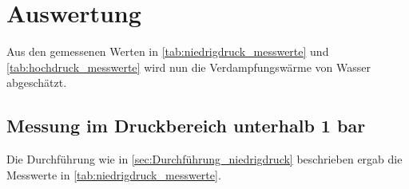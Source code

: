 \section{Auswertung}
\label{sec:Auswertung}



Aus den gemessenen Werten in \autoref{tab:niedrigdruck_messwerte} und \autoref{tab:hochdruck_messwerte} wird nun die Verdampfungswärme von Wasser abgeschätzt.

\subsection{Messung im Druckbereich unterhalb 1 bar}
\label{sec:Auswertung_niedrigdruck}

Die Durchführung wie in \autoref{sec:Durchführung_niedrigdruck} beschrieben ergab die Messwerte in \autoref{tab:niedrigdruck_messwerte}.

